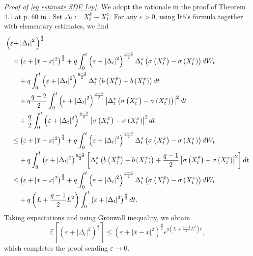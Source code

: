 \documentclass[11pt]{amsart}
\theoremstyle{plain}
\def \dd{{\rm d}}
\numberwithin{equation}{section}
\begin{document}
\smallbreak \noindent
\emph{Proof of \eqref{eq estimate SDE Lip}.}
We adopt the rationale in the proof of Theorem 4.1 at p. 60 in \cite{mao2008}.
Set $\Delta_{t}:=X_{t}^{\bar{x}}-X_{t}^{x}$. 
For any $\varepsilon>0$, using It\^o's formula together with elementary estimates, we find
\begin{equation}\label{eq useful Lip}
\begin{aligned}
\Big(\varepsilon+& \left|\Delta_{t}\right|^{2} \Big)^{\frac{q}{2}} \\
=&  \left(\varepsilon+|\bar{x}-x|^{2}\right)^{\frac{q}{2}} 
  + q \int_{0}^{t}\left(\varepsilon+\left|\Delta_{t}\right|^{2}\right)^{\frac{q-2}{2}} \Delta_{t}^{*}\left(\sigma\left(X_{t}^{\bar{x}}\right)-\sigma\left(X_{t}^{x}\right)\right) \dd W_{t} \\
& +q \int_{0}^{t}\left(\varepsilon+\left|\Delta_{t}\right|^{2}\right)^{\frac{q-2}{2}} \Delta_{t}^{*} \left(b\left(X_{t}^{\bar{x}}\right)-b\left(X_{t}^{x}\right)\right) \dd t \\
& +q \frac{q-2}{2} \int_{0}^{t}\left(\varepsilon+\left|\Delta_{t}\right|^2\right)^{\frac{q-4}{2}}\left|\Delta_{t}^* \left(\sigma\left(X_{t}^{\bar{x}}\right)-\sigma\left(X_{t}^{x}\right) \right) \right|^{2} \dd t  \\
& +\frac{q}{2} \int_{0}^{t}\left(\varepsilon+\left|\Delta_{t}\right|^{2}\right)^{\frac{q-2}{2}}\left|\sigma\left(X_{t}^{\bar{x}}\right)-\sigma\left( X_{t}^{x}\right)\right|^{2} \dd t \\
\leq & \left(\varepsilon+|\bar{x}-x|^{2}\right)^{\frac{q}{2}}
+q \int_{0}^{t}\left(\varepsilon+\left|\Delta_{t}\right|^{2}\right)^{\frac{q-2}{2}} \Delta_{t}^{*} \left(\sigma \left(X_{t}^{\bar{x}}\right)-\sigma \left(X_{t}^{x}\right)\right) \dd W_t \\
& +q \int_{0}^{t}\left(\varepsilon+|\Delta_t|^2\right)^{\frac{q-2}{2}}\left[\Delta_{t}^{*}\left(b\left(X_{t}^{\bar{x}}\right)-b\left(X_{t}^{x}\right)\right)+\frac{q-1}{2}\left|\sigma\left(X_{t}^{\bar{x}}\right)-\sigma\left(X_{t}^{x}\right)\right|^2 \right] \dd t  \\
\leq &
\left(\varepsilon+|\bar{x}-x|^{2}\right)^{\frac{q}{2}}  +q \int_{0}^{t}\left(\varepsilon+\left|\Delta_{t}\right|^{2}\right)^{\frac{q-2}{2}} \Delta_{t}^{*}\left(\sigma\left(X_{t}^{\bar{x}}\right)-\sigma\left(X_{t}^{x}\right)\right) \dd W_{t} \\
& +q\left(L+\frac{q-1}{2} L^{2}\right) \int_{0}^{t}\left(\varepsilon+|\Delta_t|^{2}\right)^{\frac{q}{2}} \dd t .
\end{aligned}
\end{equation}
Taking expectations and using Gr\"onwall inequality, we obtain
$$
\mathbb{E}\left[\left(\varepsilon+|\Delta_t|^{2}\right)^{\frac{q}{2}}\right] \leq
\left(\varepsilon+|\bar{x}-x|^{2}\right) ^{\frac q 2 }e^{q\left(L+\frac{q-1}{2} L^{2}\right) t},
$$
which completes the proof sending $\varepsilon \rightarrow 0$.
\end{document}
